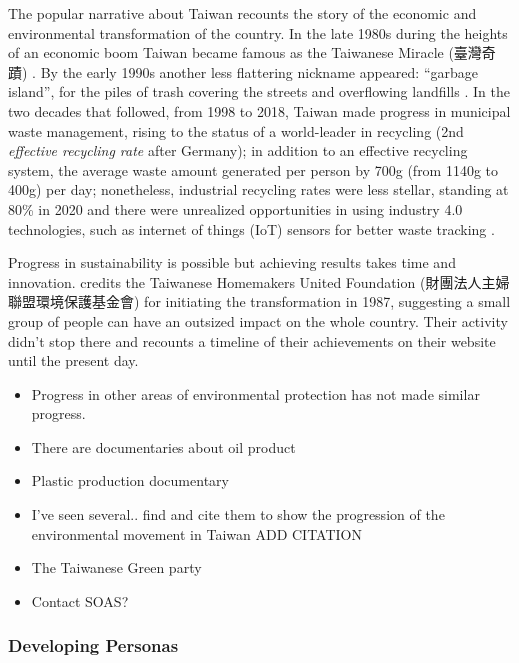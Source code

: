 \documentclass[
  letterpaper,
  DIV=11,
  numbers=noendperiod]{scrartcl}
\begin{document}
The popular narrative about Taiwan recounts the story of the economic
and environmental transformation of the country. In the late 1980s
during the heights of an economic boom Taiwan became famous as the
Taiwanese Miracle (臺灣奇蹟)
\citep{goldStateSocietyTaiwan1986, tsaiExplainingTaiwanEconomic1999}. By
the early 1990s another less flattering nickname appeared: ``garbage
island'', for the piles of trash covering the streets and overflowing
landfills
\citep{rapidtransitionsallianceTaiwanTransitionGarbage2019, ngoHowGettingRid2020}.
In the two decades that followed, from 1998 to 2018, Taiwan made
progress in municipal waste management, rising to the status of a
world-leader in recycling (2nd \emph{effective recycling rate} after
Germany); in addition to an effective recycling system, the average
waste amount generated per person by 700g (from 1140g to 400g) per day;
nonetheless, industrial recycling rates were less stellar, standing at
80\% in 2020 and there were unrealized opportunities in using industry
4.0 technologies, such as internet of things (IoT) sensors for better
waste tracking
\citep{wuSupportingCircularEconomy2021, buiMunicipalSolidWaste2023}.

Progress in sustainability is possible but achieving results takes time
and innovation.
\citep{rapidtransitionsallianceTaiwanTransitionGarbage2019} credits the
Taiwanese Homemakers United Foundation (財團法人主婦聯盟環境保護基金會)
for initiating the transformation in 1987, suggesting a small group of
people can have an outsized impact on the whole country. Their activity
didn't stop there and
\citep{CaiTuanFaRenZhuFuLianMengHuanJingBaoHuJiJinHuiBenHuiJianJie2020}
recounts a timeline of their achievements on their website until the
present day.

\begin{itemize}
\item
  Progress in other areas of environmental protection has not made
  similar progress.
\item
  There are documentaries about oil product
\item
  Plastic production documentary
\item
  I've seen several.. find and cite them to show the progression of the
  environmental movement in Taiwan ADD CITATION
\item
  The Taiwanese Green party
\item
  Contact SOAS?
\end{itemize}

\subsubsection{Developing Personas}\label{developing-personas}
\end{document}
